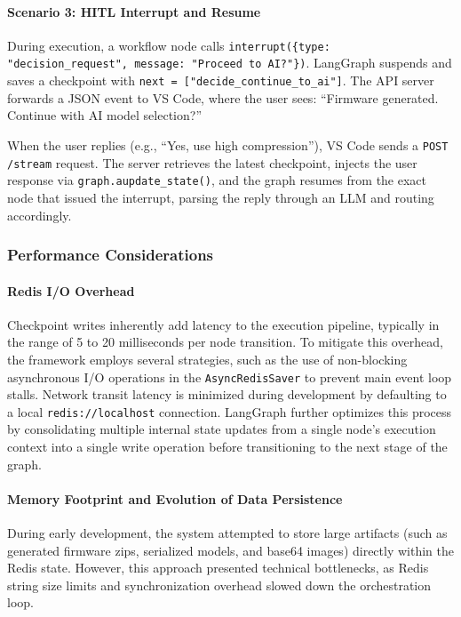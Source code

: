 \paragraph{Scenario 3: HITL Interrupt and Resume}

During execution, a workflow node calls \texttt{interrupt(\{type: "decision\_request", message: "Proceed to AI?"\})}. LangGraph suspends and saves a checkpoint with \texttt{next = ["decide\_\allowbreak continue\_\allowbreak to\_\allowbreak ai"]}. The API server forwards a JSON event to VS Code, where the user sees: ``Firmware generated. Continue with AI model selection?''

When the user replies (e.g., ``Yes, use high compression''), VS Code sends a \texttt{POST /stream} request. The server retrieves the latest checkpoint, injects the user response via \texttt{graph.aupdate\_state()}, and the graph resumes from the exact node that issued the interrupt, parsing the reply through an LLM and routing accordingly.

\subsubsection{Performance Considerations}

\paragraph{Redis I/O Overhead}

Checkpoint writes inherently add latency to the execution pipeline, typically in the range of 5 to 20 milliseconds per node transition. To mitigate this overhead, the framework employs several strategies, such as the use of non-blocking asynchronous I/O operations in the \texttt{AsyncRedisSaver} to prevent main event loop stalls. Network transit latency is minimized during development by defaulting to a local \texttt{redis://localhost} connection. LangGraph further optimizes this process by consolidating multiple internal state updates from a single node's execution context into a single write operation before transitioning to the next stage of the graph.

\paragraph{Memory Footprint and Evolution of Data Persistence}

During early development, the system attempted to store large artifacts (such as generated firmware zips, serialized models, and base64 images) directly within the Redis state. However, this approach presented technical bottlenecks, as Redis string size limits and synchronization overhead slowed down the orchestration loop.

